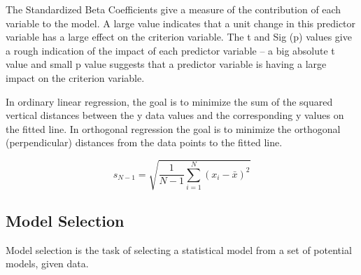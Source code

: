 The Standardized Beta Coefficients give a measure of the
contribution of each variable to the model. A large value indicates that a unit change in this predictor variable has a large effect on the criterion variable.
The t and Sig (p) values give a
rough indication of the impact of each predictor variable – a big
absolute t value and small p value suggests that a predictor variable
is having a large impact on the criterion variable.



\newpage

	In ordinary linear regression, the goal is to minimize the sum of
		the squared vertical distances between the y data values and the
		corresponding y values on the fitted line. In orthogonal
		regression the goal is to minimize the orthogonal (perpendicular)
		distances from the data points to the fitted line.
		
		
		
		
		\[ s_{N - 1} = \sqrt {\frac{1}{{N - 1}}\sum\limits_{i = 1}^N {\left( {x_i - \bar x} \right)^2 }
		} \]
		
		

%
%
%




\subsection{Model Selection}

Model selection is the task of selecting a statistical model from a set of potential models, given data.


%
%




